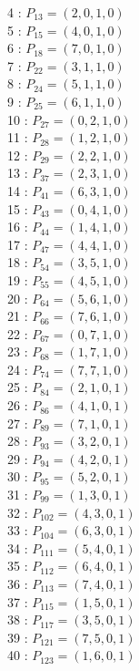 \documentclass{article}
\begin{document}
{\begin{multicols}{3}
4 : $P_{13}=( 2, 0, 1, 0 )$\\
5 : $P_{15}=( 4, 0, 1, 0 )$\\
6 : $P_{18}=( 7, 0, 1, 0 )$\\
7 : $P_{22}=( 3, 1, 1, 0 )$\\
8 : $P_{24}=( 5, 1, 1, 0 )$\\
9 : $P_{25}=( 6, 1, 1, 0 )$\\
10 : $P_{27}=( 0, 2, 1, 0 )$\\
11 : $P_{28}=( 1, 2, 1, 0 )$\\
12 : $P_{29}=( 2, 2, 1, 0 )$\\
13 : $P_{37}=( 2, 3, 1, 0 )$\\
14 : $P_{41}=( 6, 3, 1, 0 )$\\
15 : $P_{43}=( 0, 4, 1, 0 )$\\
16 : $P_{44}=( 1, 4, 1, 0 )$\\
17 : $P_{47}=( 4, 4, 1, 0 )$\\
18 : $P_{54}=( 3, 5, 1, 0 )$\\
19 : $P_{55}=( 4, 5, 1, 0 )$\\
20 : $P_{64}=( 5, 6, 1, 0 )$\\
21 : $P_{66}=( 7, 6, 1, 0 )$\\
22 : $P_{67}=( 0, 7, 1, 0 )$\\
23 : $P_{68}=( 1, 7, 1, 0 )$\\
24 : $P_{74}=( 7, 7, 1, 0 )$\\
25 : $P_{84}=( 2, 1, 0, 1 )$\\
26 : $P_{86}=( 4, 1, 0, 1 )$\\
27 : $P_{89}=( 7, 1, 0, 1 )$\\
28 : $P_{93}=( 3, 2, 0, 1 )$\\
29 : $P_{94}=( 4, 2, 0, 1 )$\\
30 : $P_{95}=( 5, 2, 0, 1 )$\\
31 : $P_{99}=( 1, 3, 0, 1 )$\\
32 : $P_{102}=( 4, 3, 0, 1 )$\\
33 : $P_{104}=( 6, 3, 0, 1 )$\\
34 : $P_{111}=( 5, 4, 0, 1 )$\\
35 : $P_{112}=( 6, 4, 0, 1 )$\\
36 : $P_{113}=( 7, 4, 0, 1 )$\\
37 : $P_{115}=( 1, 5, 0, 1 )$\\
38 : $P_{117}=( 3, 5, 0, 1 )$\\
39 : $P_{121}=( 7, 5, 0, 1 )$\\
40 : $P_{123}=( 1, 6, 0, 1 )$\\

\end{multicols}}
\end{document}
